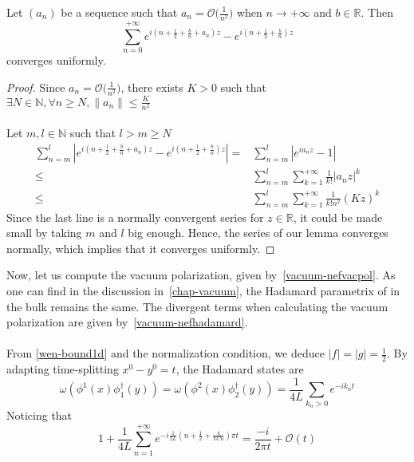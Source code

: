 %
\begin{lemma}
Let $(a_n)$ be a sequence such that $a_n = \mathcal{O}\big(\frac{1}{n^2})$ when $n\rightarrow+\infty$ and $b\in\mathbb{R}$. Then
\begin{equation*}
\sum_{n=0}^{+\infty} e^{i(n+\frac 1 2+\frac{b}{n}+a_n)z } - e^{i(n+\frac 1 2+\frac{b}{n})z }
\end{equation*}
converges uniformly.
\end{lemma}
\begin{proof}
Since $a_n = \mathcal{O}\big(\frac{1}{n^2}\big)$, 
there exists $ K > 0$ such that $ \exists N \in\mathbb{N}, \forall n\geq N, \| a_n\| \leq \frac{K}{n^2}$ \\\\
Let $m,l\in\mathbb{N}$ such that $l > m \geq N$
\begin{equation*}
\begin{split}
\sum_{n=m}^{l}  | e^{i(n + \frac 1 2+\frac{b}{n}+a_n)z } - e^{i(n+\frac 1 2+\frac{b}{n})z } | = & 
\sum_{n=m}^{l} | e^{ia_n z} - 1 | \\
%
\leq & \sum_{n=m}^{l}\sum_{k=1}^{+\infty}\frac{1}{k!}| a_n z |^k \\
%
\leq & \sum_{n=m}^l \sum_{k=1}^{+\infty}\frac{1}{k!n^2}(Kz)^k
\end{split}
\end{equation*}
Since the last line is a normally convergent series for $z \in \mathbb{R}$, it could be made small by taking $m$ and $l$ big enough.
Hence, the series of our lemma converges normally, which implies that it converges uniformly.
\end{proof}
Now, let us compute the vacuum polarization, given by~\cref{vacuum-nefvacpol}.
As one can find in the discussion in~\cref{chap-vacuum}, the Hadamard parametrix of in the bulk remains the same. 
The divergent terms when calculating the vacuum polarization are given by~\cref{vacuum-nefhadamard}. \\\\
From \cref{wen-bound1d} and the normalization condition, we deduce $|f| = |g| = \frac 1 2$.
By adapting time-splitting $x^0 - y^0 = t$, the Hadamard states are
\begin{equation*}
\omega(\phi^1(x)\phi^\dagger_1(y)) = \omega(\phi^2(x)\phi^\dagger_2(y)) = 
\frac{1}{4L}\sum_{k_n>0} e^{-ik_nt}
\end{equation*} 
Noticing that 
\begin{equation*}
1 + \frac{ 1}{ 4L}\sum_{n=1}^{+\infty} e^{-i\frac{1}{2L}(n+\frac 1 2 + \frac{4}{\pi C n} ) \pi t} 
= \frac{-i}{2\pi t} + \mathcal{O}(t)
\end{equation*}
